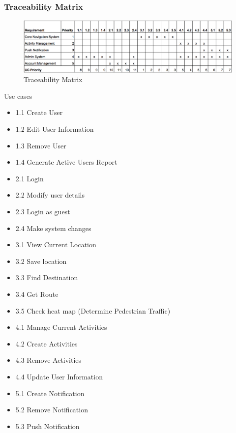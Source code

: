 \documentclass[a4paper,12pt]{article}
\begin{document}
\subsubsection{Traceability Matrix}
\begin{figure}[H]
\includegraphics[width=\textwidth]{Traceability/Traceability.png}
\caption{Traceability Matrix}
\label{fig:Traceability Matrix}
\end{figure}
Use cases
\begin{itemize}
\item 1.1 Create User
\item 1.2 Edit User Information
\item 1.3 Remove User
\item 1.4 Generate Active Users Report
\end{itemize}

\begin{itemize}
\item 2.1 Login
\item 2.2 Modify user details
\item 2.3 Login as guest 
\item 2.4 Make system changes 
\end{itemize}


\begin{itemize}
\item 3.1 View Current Location
\item 3.2 Save location
\item 3.3 Find Destination 
\item 3.4 Get Route
\item 3.5 Check heat map (Determine Pedestrian Traffic)
\end{itemize}

\begin{itemize}
\item 4.1 Manage Current Activities
\item 4.2 Create Activities
\item 4.3 Remove Activities
\item 4.4 Update User Information
\end{itemize}

\begin{itemize}
\item 5.1 Create Notification
\item 5.2 Remove Notification
\item 5.3 Push Notification
\end{itemize}
\end{document}
